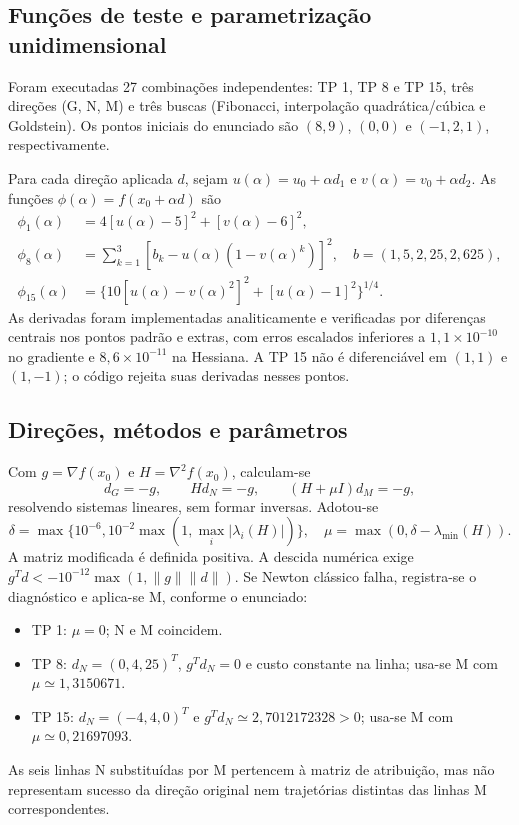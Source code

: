 \documentclass[12pt,a4paper]{article}
\begin{document}
\subsection{Funções de teste e parametrização unidimensional}
Foram executadas 27 combinações independentes: TP 1, TP 8 e TP 15,
três direções (G, N, M) e três buscas (Fibonacci, interpolação
quadrática/cúbica e Goldstein). Os pontos iniciais do enunciado são
$(8,9)$, $(0,0)$ e $(-1{,}2,1)$, respectivamente.

Para cada direção aplicada $d$, sejam $u(\alpha)=u_0+\alpha d_1$ e
$v(\alpha)=v_0+\alpha d_2$. As funções $\phi(\alpha)=f(x_0+\alpha d)$ são
\begin{align*}
\phi_1(\alpha)&=4[u(\alpha)-5]^2+[v(\alpha)-6]^2,\\
\phi_8(\alpha)&=\sum_{k=1}^3[b_k-u(\alpha)(1-v(\alpha)^k)]^2,
\quad b=(1{,}5,2{,}25,2{,}625),\\
\phi_{15}(\alpha)&=\{10[u(\alpha)-v(\alpha)^2]^2+[u(\alpha)-1]^2\}^{1/4}.
\end{align*}
As derivadas foram implementadas analiticamente e verificadas por diferenças
centrais nos pontos padrão e extras, com erros escalados inferiores a
$1{,}1\times10^{-10}$ no gradiente e $8{,}6\times10^{-11}$ na Hessiana.
A TP 15 não é diferenciável em $(1,1)$ e $(1,-1)$; o código rejeita suas
derivadas nesses pontos.

\subsection{Direções, métodos e parâmetros}
Com $g=\nabla f(x_0)$ e $H=\nabla^2f(x_0)$, calculam-se
\[
d_G=-g,\qquad Hd_N=-g,\qquad(H+\mu I)d_M=-g,
\]
resolvendo sistemas lineares, sem formar inversas. Adotou-se
\[
\delta=\max\{10^{-6},10^{-2}\max(1,\max_i|\lambda_i(H)|)\},\quad
\mu=\max(0,\delta-\lambda_{\min}(H)).
\]
A matriz modificada é definida positiva. A descida numérica exige
$g^Td<-10^{-12}\max(1,\|g\|\|d\|)$. Se Newton clássico falha, registra-se
o diagnóstico e aplica-se M, conforme o enunciado:
\begin{itemize}
\item TP 1: $\mu=0$; N e M coincidem.
\item TP 8: $d_N=(0,4{,}25)^T$, $g^Td_N=0$ e custo constante na linha;
usa-se M com $\mu\simeq1{,}3150671$.
\item TP 15: $d_N=(-4{,}4,0)^T$ e $g^Td_N\simeq2{,}7012172328>0$;
usa-se M com $\mu\simeq0{,}21697093$.
\end{itemize}
As seis linhas N substituídas por M pertencem à matriz de atribuição,
mas não representam sucesso da direção original nem trajetórias distintas
das linhas M correspondentes.
\end{document}
